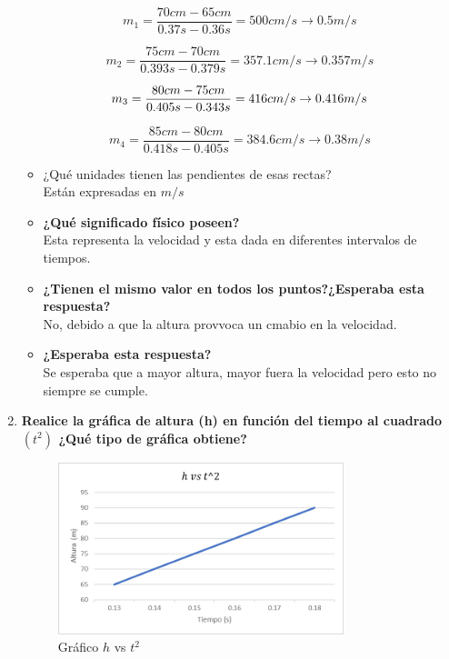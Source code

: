 \documentclass[11pt,twocolumn]{article}
\begin{document}
\begin{enumerate}
$$m_{1}=\frac{70cm-65cm}{0.37s-0.36s}=500 cm/s\rightarrow 0.5m/s$$

$$m_{2}=\frac{75cm-70cm}{0.393s-0.379s}=357.1cm/s\rightarrow 0.357m/s$$

$$m_{3}=\frac{80cm-75cm}{0.405s-0.343s}=416cm/s\rightarrow 0.416m/s\\
$$

$$m_{4}=\frac{85cm-80cm}{0.418s-0.405s}=384.6cm/s\rightarrow 0.38m/s$$

\begin{itemize}
    \item ¿Qué unidades tienen las pendientes de esas rectas?\\

    Están expresadas en $m/s$\\

    \item \textbf{¿Qué significado físico poseen?}\\

    Esta representa la velocidad y esta dada en diferentes intervalos de tiempos.\\

    \item \textbf{¿Tienen el mismo valor en todos los puntos?¿Esperaba esta respuesta?}\\

    No, debido a que la altura provvoca un cmabio en la velocidad.\\

    \item \textbf{¿Esperaba esta respuesta?}\\

    Se esperaba que a mayor altura, mayor fuera la velocidad pero esto no siempre se cumple.

    
\end{itemize}

\item \textbf{Realice la gráfica de altura (h) en función del tiempo al cuadrado $\left(t^{2}\right)$ ¿Qué tipo de gráfica obtiene?}\\

\begin{figure}[H]
    \centering
    \includegraphics[width=7 cm, height=5cm]{Imagen4.png}
    \caption{Gráfico $h$ vs $t^{2}$}
    \label{fig:my_label}
\end{figure}



\end{enumerate}
\end{document}
